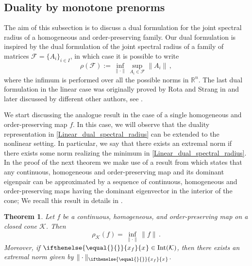 \documentclass{article}
\newtheorem{theorem}{Theorem}[section]
\newcommand{\R}{\mathbb{R}}
\newcommand{\family}{\mathcal{F}}
\newcommand{\radius}{\rho}
\newcommand{\cradius}{\rho_{\cone}}
\newcommand{\cone}{\mathcal{K}}
\newcommand{\interior}{\mathrm{Int}}
\newcommand{\ceigenvector}[1][]{
  \ifthenelse{\equal{#1}{}}
  {{x_f}}
  {{x}_{#1}}}
\begin{document}
\subsection{Duality by monotone prenorms}\label{sec:duality_monotone_prenorms}
The aim of this subsection is to discuss a dual formulation for the joint spectral radius of a homogeneous and order-preserving family. Our dual formulation is inspired by the dual formulation of the joint spectral radius of a family of matrices $\family=\{A_i\}_{i\in I}$, in which case it is possible to write
%
\begin{equation}\label{Linear_dual_spectral_radius}
\radius(\family):=\inf_{\|\cdot\|}\sup_{A_i\in \family}\|A_i\|\,,
\end{equation}
where the infimum is performed over all the possible norms in $\R^n$. The last dual formulation in the linear case was originally proved by Rota and Strang in \cite{rota1960note} and later discussed by different other authors, see \cite{elsner1995generalized,shih1997asymptotic}.


We start discussing the analogue result in the case of a single homogeneous and order-preserving map $f$. %
%
In this case, we will observe that the duality representation in \eqref{Linear_dual_spectral_radius} can be extended to the nonlinear setting. In particular, we say that there exists an extremal norm if there exists some norm realizing the minimum in \eqref{Linear_dual_spectral_radius}.
%
In the proof of the next theorem we make use of a result from \cite{lemmens2012nonlinear} which states that any continuous, homogeneous and order-preserving map and its dominant eigenpair can be approximated by a sequence of continuous, homogeneous and order-preserving maps having the dominant eigenvector in the interior of the cone; We recall this result in details in .
%
%
\begin{theorem}\label{Theorem_duality_cone_spectral_radius}
Let $f$ be a continuous, homogeneous, and order-preserving map on a closed cone $\cone$. Then
%
$$
\cradius(f)=\inf_{\|\cdot\|}\|f\|\,.
$$
Moreover, if $\ceigenvector\in\interior(\cone)$, then  there exists an extremal norm given by $\|\cdot\|_{\ceigenvector}$.
\end{theorem}
\end{document}
